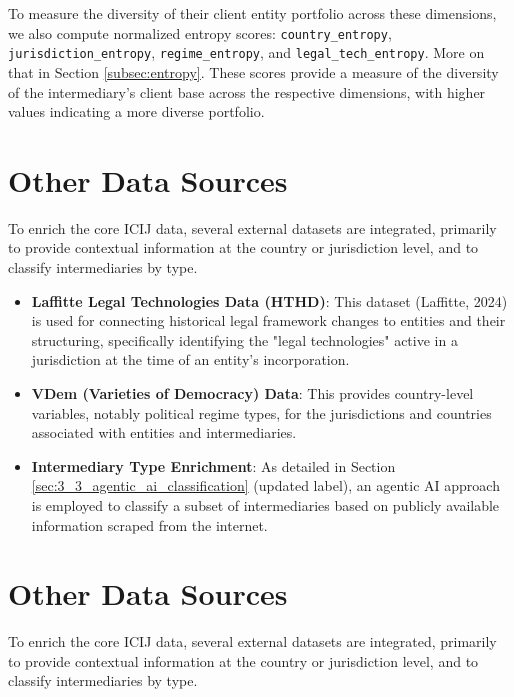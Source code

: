 To measure the diversity of their client entity portfolio across these dimensions, we also compute normalized entropy scores: \texttt{country\_entropy}, \texttt{jurisdiction\_entropy}, \texttt{regime\_entropy}, and \texttt{legal\_tech\_entropy}. More on that in Section \ref{subsec:entropy}. These scores provide a measure of the diversity of the intermediary's client base across the respective dimensions, with higher values indicating a more diverse portfolio.

\section{Other Data Sources}
\label{sec:3_2}
To enrich the core ICIJ data, several external datasets are integrated, primarily to provide contextual information at the country or jurisdiction level, and to classify intermediaries by type.

\begin{itemize}
    \item \textbf{Laffitte Legal Technologies Data (HTHD)}: This dataset (Laffitte, 2024) is used for connecting historical legal framework changes to entities and their structuring, specifically identifying the "legal technologies" active in a jurisdiction at the time of an entity's incorporation.
    \item \textbf{VDem (Varieties of Democracy) Data}: This provides country-level variables, notably political regime types, for the jurisdictions and countries associated with entities and intermediaries.
    \item \textbf{Intermediary Type Enrichment}: As detailed in Section \ref{sec:3_3_agentic_ai_classification} (updated label), an agentic AI approach is employed to classify a subset of intermediaries based on publicly available information scraped from the internet.
\end{itemize}

\section{Other Data Sources}
\label{sec:3_2}
To enrich the core ICIJ data, several external datasets are integrated, primarily to provide contextual information at the country or jurisdiction level, and to classify intermediaries by type.


